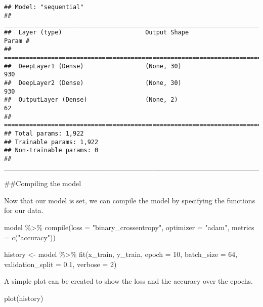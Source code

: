 \documentclass[
]{article}
\newenvironment{Shaded}{\begin{snugshade}}{\end{snugshade}}
\newcommand{\AttributeTok}[1]{\textcolor[rgb]{0.77,0.63,0.00}{#1}}
\newcommand{\DecValTok}[1]{\textcolor[rgb]{0.00,0.00,0.81}{#1}}
\newcommand{\FloatTok}[1]{\textcolor[rgb]{0.00,0.00,0.81}{#1}}
\newcommand{\FunctionTok}[1]{\textcolor[rgb]{0.00,0.00,0.00}{#1}}
\newcommand{\NormalTok}[1]{#1}
\newcommand{\OtherTok}[1]{\textcolor[rgb]{0.56,0.35,0.01}{#1}}
\newcommand{\SpecialCharTok}[1]{\textcolor[rgb]{0.00,0.00,0.00}{#1}}
\newcommand{\StringTok}[1]{\textcolor[rgb]{0.31,0.60,0.02}{#1}}
\begin{document}
\begin{verbatim}
## Model: "sequential"
## ________________________________________________________________________________
##  Layer (type)                       Output Shape                    Param #     
## ================================================================================
##  DeepLayer1 (Dense)                 (None, 30)                      930         
##  DeepLayer2 (Dense)                 (None, 30)                      930         
##  OutputLayer (Dense)                (None, 2)                       62          
## ================================================================================
## Total params: 1,922
## Trainable params: 1,922
## Non-trainable params: 0
## ________________________________________________________________________________
\end{verbatim}

\#\#Compiling the model

Now that our model is set, we can compile the model by specifying the
functions for our data.

\begin{Shaded}
\begin{Highlighting}[]
\NormalTok{model }\SpecialCharTok{\%\textgreater{}\%} \FunctionTok{compile}\NormalTok{(}\AttributeTok{loss =} \StringTok{"binary\_crossentropy"}\NormalTok{,}
                  \AttributeTok{optimizer =} \StringTok{"adam"}\NormalTok{,}
                  \AttributeTok{metrics =} \FunctionTok{c}\NormalTok{(}\StringTok{"accuracy"}\NormalTok{))}
\end{Highlighting}
\end{Shaded}

\begin{Shaded}
\begin{Highlighting}[]
\NormalTok{history }\OtherTok{\textless{}{-}}\NormalTok{ model }\SpecialCharTok{\%\textgreater{}\%} 
  \FunctionTok{fit}\NormalTok{(x\_train,}
\NormalTok{      y\_train,}
      \AttributeTok{epoch =} \DecValTok{10}\NormalTok{,}
      \AttributeTok{batch\_size =} \DecValTok{64}\NormalTok{,}
      \AttributeTok{validation\_split =} \FloatTok{0.1}\NormalTok{,}
      \AttributeTok{verbose =} \DecValTok{2}\NormalTok{)}
\end{Highlighting}
\end{Shaded}

A simple plot can be created to show the loss and the accuracy over the
epochs.

\begin{Shaded}
\begin{Highlighting}[]
\FunctionTok{plot}\NormalTok{(history)}
\end{Highlighting}
\end{Shaded}
\end{document}
